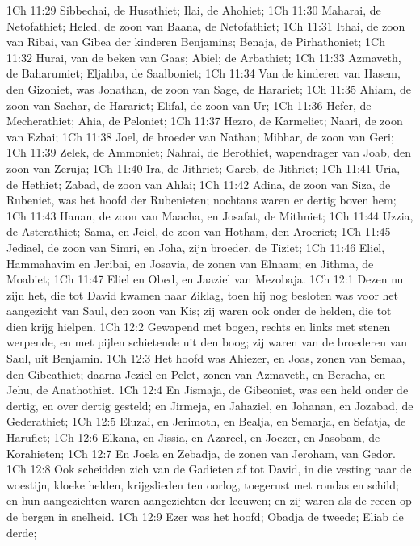 1Ch 11:29  Sibbechai, de Husathiet; Ilai, de Ahohiet;
1Ch 11:30  Maharai, de Netofathiet; Heled, de zoon van Baana, de Netofathiet;
1Ch 11:31  Ithai, de zoon van Ribai, van Gibea der kinderen Benjamins; Benaja, de Pirhathoniet;
1Ch 11:32  Hurai, van de beken van Gaas; Abiel; de Arbathiet;
1Ch 11:33  Azmaveth, de Baharumiet; Eljahba, de Saalboniet;
1Ch 11:34  Van de kinderen van Hasem, den Gizoniet, was Jonathan, de zoon van Sage, de Harariet;
1Ch 11:35  Ahiam, de zoon van Sachar, de Harariet; Elifal, de zoon van Ur;
1Ch 11:36  Hefer, de Mecherathiet; Ahia, de Peloniet;
1Ch 11:37  Hezro, de Karmeliet; Naari, de zoon van Ezbai;
1Ch 11:38  Joel, de broeder van Nathan; Mibhar, de zoon van Geri;
1Ch 11:39  Zelek, de Ammoniet; Nahrai, de Berothiet, wapendrager van Joab, den zoon van Zeruja;
1Ch 11:40  Ira, de Jithriet; Gareb, de Jithriet;
1Ch 11:41  Uria, de Hethiet; Zabad, de zoon van Ahlai;
1Ch 11:42  Adina, de zoon van Siza, de Rubeniet, was het hoofd der Rubenieten; nochtans waren er dertig boven hem;
1Ch 11:43  Hanan, de zoon van Maacha, en Josafat, de Mithniet;
1Ch 11:44  Uzzia, de Asterathiet; Sama, en Jeiel, de zoon van Hotham, den Aroeriet;
1Ch 11:45  Jediael, de zoon van Simri, en Joha, zijn broeder, de Tiziet;
1Ch 11:46  Eliel, Hammahavim en Jeribai, en Josavia, de zonen van Elnaam; en Jithma, de Moabiet;
1Ch 11:47  Eliel en Obed, en Jaaziel van Mezobaja.
1Ch 12:1  Dezen nu zijn het, die tot David kwamen naar Ziklag, toen hij nog besloten was voor het aangezicht van Saul, den zoon van Kis; zij waren ook onder de helden, die tot dien krijg hielpen.
1Ch 12:2  Gewapend met bogen, rechts en links met stenen werpende, en met pijlen schietende uit den boog; zij waren van de broederen van Saul, uit Benjamin.
1Ch 12:3  Het hoofd was Ahiezer, en Joas, zonen van Semaa, den Gibeathiet; daarna Jeziel en Pelet, zonen van Azmaveth, en Beracha, en Jehu, de Anathothiet.
1Ch 12:4  En Jismaja, de Gibeoniet, was een held onder de dertig, en over dertig gesteld; en Jirmeja, en Jahaziel, en Johanan, en Jozabad, de Gederathiet;
1Ch 12:5  Eluzai, en Jerimoth, en Bealja, en Semarja, en Sefatja, de Harufiet;
1Ch 12:6  Elkana, en Jissia, en Azareel, en Joezer, en Jasobam, de Korahieten;
1Ch 12:7  En Joela en Zebadja, de zonen van Jeroham, van Gedor.
1Ch 12:8  Ook scheidden zich van de Gadieten af tot David, in die vesting naar de woestijn, kloeke helden, krijgslieden ten oorlog, toegerust met rondas en schild; en hun aangezichten waren aangezichten der leeuwen; en zij waren als de reeen op de bergen in snelheid.
1Ch 12:9  Ezer was het hoofd; Obadja de tweede; Eliab de derde;

